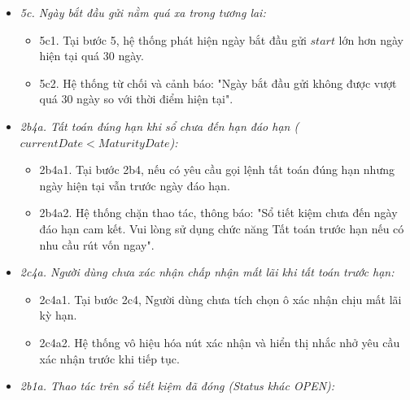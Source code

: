 \documentclass[11pt,a4paper]{article}
\providecommand{\tightlist}{
  \setlength{\itemsep}{0pt}\setlength{\parskip}{0pt}}
\begin{document}
\begin{itemize}
\begin{itemize}
    \begin{itemize}
    \tightlist
    \item
      5b1. Tại bước 5, hệ thống phát hiện \(principal \le 0\) hoặc
      \(rate \le 0\).
    \item
      5b2. Hệ thống báo lỗi: "Vốn gốc và lãi suất gửi tiết kiệm phải là
      số dương lớn hơn 0".
    \item
      5b3. Người dùng nhập lại các giá trị hợp lệ.
    \end{itemize}
  \item
    \emph{5c. Ngày bắt đầu gửi nằm quá xa trong tương lai:}

    \begin{itemize}
    \tightlist
    \item
      5c1. Tại bước 5, hệ thống phát hiện ngày bắt đầu gửi \(start\) lớn
      hơn ngày hiện tại quá 30 ngày.
    \item
      5c2. Hệ thống từ chối và cảnh báo: "Ngày bắt đầu gửi không được
      vượt quá 30 ngày so với thời điểm hiện tại".
    \end{itemize}
  \item
    \emph{2b4a. Tất toán đúng hạn khi sổ chưa đến hạn đáo hạn
    (\(currentDate < MaturityDate\)):}

    \begin{itemize}
    \tightlist
    \item
      2b4a1. Tại bước 2b4, nếu có yêu cầu gọi lệnh tất toán đúng hạn
      nhưng ngày hiện tại vẫn trước ngày đáo hạn.
    \item
      2b4a2. Hệ thống chặn thao tác, thông báo: "Sổ tiết kiệm chưa đến
      ngày đáo hạn cam kết. Vui lòng sử dụng chức năng Tất toán trước
      hạn nếu có nhu cầu rút vốn ngay".
    \end{itemize}
  \item
    \emph{2c4a. Người dùng chưa xác nhận chấp nhận mất lãi khi tất toán
    trước hạn:}

    \begin{itemize}
    \tightlist
    \item
      2c4a1. Tại bước 2c4, Người dùng chưa tích chọn ô xác nhận chịu mất
      lãi kỳ hạn.
    \item
      2c4a2. Hệ thống vô hiệu hóa nút xác nhận và hiển thị nhắc nhở yêu
      cầu xác nhận trước khi tiếp tục.
    \end{itemize}
  \item
    \emph{2b1a. Thao tác trên sổ tiết kiệm đã đóng (Status khác OPEN):}


\end{itemize}
\end{itemize}
\end{document}

